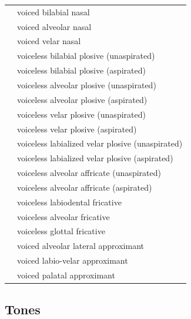 \documentclass{article}
\begin{document}
\begin{xltabular}{\textwidth}{lL}
   & voiced bilabial nasal \\
   & voiced alveolar nasal \\
   & voiced velar nasal \\
   & voiceless bilabial plosive (unaspirated) \\
   & voiceless bilabial plosive (aspirated) \\
   & voiceless alveolar plosive (unaspirated) \\
   & voiceless alveolar plosive (aspirated) \\
   & voiceless velar plosive (unaspirated) \\
   & voiceless velar plosive (aspirated) \\
   & voiceless labialized velar plosive (unaspirated) \\
   & voiceless labialized velar plosive (aspirated) \\
   & voiceless alveolar affricate (unaspirated) \\
   & voiceless alveolar affricate (aspirated) \\
   & voiceless labiodental fricative \\
   & voiceless alveolar fricative \\
   & voiceless glottal fricative \\
   & voiced alveolar lateral approximant \\
   & voiced labio-velar approximant \\
   & voiced palatal approximant \\
\end{xltabular}

\subsection{Tones}
\end{document}
